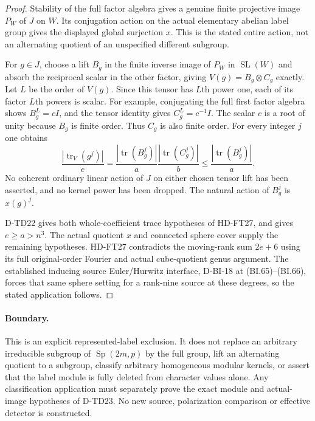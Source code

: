 \begin{proof}
Stability of the full factor algebra gives a genuine finite
projective image $P_W$ of $J$ on $W$. Its conjugation action on
the actual elementary abelian label group gives the displayed
global surjection $x$. This is the stated entire action, not an
alternating quotient of an unspecified different subgroup.

For $g\in J$, choose a lift $B_g$ in the finite inverse image
of $P_W$ in $\operatorname{SL}(W)$ and absorb the reciprocal scalar
in the other factor, giving $V(g)=B_g\otimes C_g$ exactly.
Let $L$ be the order of $V(g)$. Since this tensor has $L$th power
one, each of its factor $L$th powers is scalar. For example,
conjugating the full first factor algebra shows $B_g^L=cI$,
and the tensor identity gives $C_g^L=c^{-1}I$.
The scalar $c$ is a root of unity because $B_g$ is finite order.
Thus $C_g$ is also finite order. For every integer $j$ one obtains
\[
 \frac{|\operatorname{tr}_V(g^j)|}{e}
 =\frac{|\operatorname{tr}(B_g^j)|}{a}
     \frac{|\operatorname{tr}(C_g^j)|}{b}
 \le\frac{|\operatorname{tr}(B_g^j)|}{a}.
 \tag{TDB.11}
\]
No coherent ordinary linear action of $J$ on either chosen tensor
lift has been asserted, and no kernel power has been dropped.
The natural action of $B_g^j$ is $x(g)^j$.

D-TD22 gives both whole-coefficient trace hypotheses of HD-FT27,
and gives $e\ge a>n^3$. The actual quotient $x$ and connected
sphere cover supply the remaining hypotheses. HD-FT27 contradicts
the moving-rank sum $2e+6$ using its full original-order Fourier
and actual cube-quotient genus argument. The established inducing
source Euler/Hurwitz interface, D-BI-18 at (BI.65)--(BI.66),
forces that same sphere setting for a rank-nine source at these
degrees, so the stated application follows.
\end{proof}

\paragraph{Boundary.}
This is an explicit represented-label exclusion. It does not replace
an arbitrary irreducible subgroup of $\operatorname{Sp}(2m,p)$
by the full group, lift an alternating quotient to a subgroup,
classify arbitrary homogeneous modular kernels, or assert that
the label module is fully deleted from character values alone.
Any classification application must separately prove the exact
module and actual-image hypotheses of D-TD23. No new source,
polarization comparison or effective detector is constructed.
